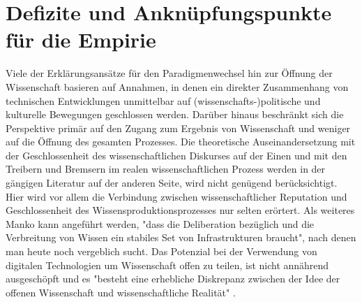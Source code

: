 \section{Defizite und Anknüpfungspunkte für die Empirie}
Viele der Erklärungsansätze für den Paradigmenwechsel hin zur Öffnung der Wissenschaft basieren auf Annahmen, in denen ein direkter Zusammenhang von technischen Entwicklungen unmittelbar auf (wissenschafts-)politische und kulturelle Bewegungen geschlossen werden. Darüber hinaus beschränkt sich die Perspektive primär auf den Zugang zum Ergebnis von Wissenschaft und weniger auf die Öffnung des gesamten Prozesses. Die theoretische Auseinandersetzung mit der Geschlossenheit des wissenschaftlichen Diskurses  auf der Einen und mit den Treibern und Bremsern im realen wissenschaftlichen Prozess werden in der gängigen Literatur auf der anderen Seite, wird nicht genügend berücksichtigt. Hier wird vor allem die Verbindung zwischen wissenschaftlicher Reputation und Geschlossenheit des Wissensproduktionsprozesses nur selten erörtert. Als weiteres Manko kann angeführt werden, "dass die Deliberation bezüglich und die Verbreitung von Wissen ein stabiles Set von Infrastrukturen braucht"\cite{kelty_2004}, nach denen man heute noch vergeblich sucht. Das Potenzial bei der Verwendung von digitalen Technologien um Wissenschaft offen zu teilen, ist nicht annährend ausgeschöpft und es "besteht eine erhebliche Diskrepanz zwischen der Idee der offenen Wissenschaft und wissenschaftliche Realität" \cite{Scheliga_2014}.
